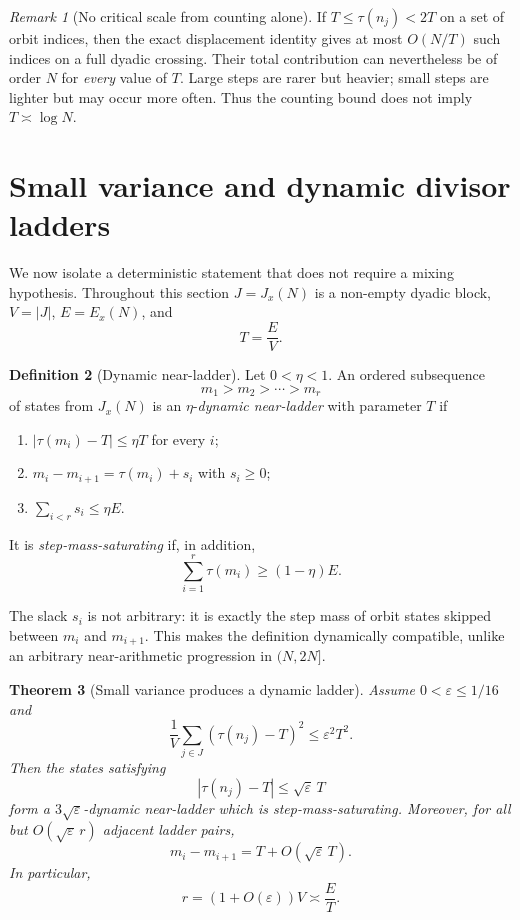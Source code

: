 \documentclass[11pt]{article}
\newtheorem{theorem}{Theorem}[section]
\theoremstyle{definition}
\newtheorem{definition}[theorem]{Definition}
\theoremstyle{remark}
\newtheorem{remark}[theorem]{Remark}
\begin{document}
\begin{remark}[No critical scale from counting alone]\label{rem:no-critical}
If $T\leq\tau(n_j)<2T$ on a set of orbit indices, then the exact
displacement identity gives at most $O(N/T)$ such indices on a full
dyadic crossing.  Their total contribution can nevertheless be of
order $N$ for \emph{every} value of $T$.  Large steps are rarer but
heavier; small steps are lighter but may occur more often.  Thus the
counting bound does not imply $T\asymp\log N$.
\end{remark}

\section{Small variance and dynamic divisor ladders}\label{sec:ladders}

We now isolate a deterministic statement that does not require a
mixing hypothesis.  Throughout this section $J=J_x(N)$ is a non-empty
dyadic block, $V=|J|$, $E=E_x(N)$, and
\[
 T=\frac EV.
\]

\begin{definition}[Dynamic near-ladder]\label{def:dynamic-ladder}
Let $0<\eta<1$.  An ordered subsequence
\[
 m_1>m_2>\cdots>m_r
\]
of states from $J_x(N)$ is an $\eta$-\emph{dynamic near-ladder} with
parameter $T$ if
\begin{enumerate}[label=\textup{(\roman*)}]
 \item $|\tau(m_i)-T|\leq\eta T$ for every $i$;
 \item $m_i-m_{i+1}=\tau(m_i)+s_i$ with $s_i\geq0$;
 \item $\sum_{i<r}s_i\leq\eta E$.
\end{enumerate}
It is \emph{step-mass-saturating} if, in addition,
\[
 \sum_{i=1}^r\tau(m_i)\geq(1-\eta)E.
\]
\end{definition}

The slack $s_i$ is not arbitrary: it is exactly the step mass of orbit
states skipped between $m_i$ and $m_{i+1}$.  This makes the definition
dynamically compatible, unlike an arbitrary near-arithmetic
progression in $(N,2N]$.

\begin{theorem}[Small variance produces a dynamic ladder]
\label{thm:variance-ladder}
Assume $0<\varepsilon\leq1/16$ and
\begin{equation}\label{eq:variance-assumption}
 \frac1V\sum_{j\in J}(\tau(n_j)-T)^2
 \leq\varepsilon^2T^2.
\end{equation}
Then the states satisfying
\[
 |\tau(n_j)-T|\leq\sqrt\varepsilon\,T
\]
form a $3\sqrt\varepsilon$-dynamic near-ladder which is
step-mass-saturating.  Moreover, for all but
$O(\sqrt\varepsilon\,r)$ adjacent ladder pairs,
\begin{equation}\label{eq:ladder-gaps}
 m_i-m_{i+1}=T+O(\sqrt\varepsilon\,T).
\end{equation}
In particular,
\[
 r=(1+O(\varepsilon))V\asymp\frac ET.
\]
\end{theorem}
\end{document}

